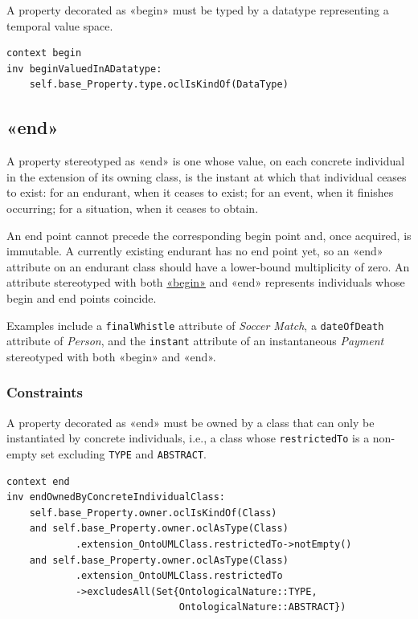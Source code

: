 \begin{constraint}
\label{beginValuedInADatatype}
A property decorated as «begin» must be typed by a datatype representing a temporal value space.
 
\begin{lstlisting}[language=OCL]
context begin
inv beginValuedInADatatype:
    self.base_Property.type.oclIsKindOf(DataType)
\end{lstlisting}
\end{constraint}
 
\subsection{«end»}
\label{stereotype:end}
 
A property stereotyped as «end» is one whose value, on each concrete individual in the extension of its owning class, is the instant at which that individual ceases to exist: for an endurant, when it ceases to exist; for an event, when it finishes occurring; for a situation, when it ceases to obtain.
 
An end point cannot precede the corresponding begin point and, once acquired, is immutable. A currently existing endurant has no end point yet, so an «end» attribute on an endurant class should have a lower-bound multiplicity of zero. An attribute stereotyped with both \hyperref[stereotype:begin]{«begin»} and «end» represents individuals whose begin and end points coincide.
 
Examples include a \texttt{finalWhistle} attribute of \textit{Soccer Match}, a \texttt{dateOfDeath} attribute of \textit{Person}, and the \texttt{instant} attribute of an instantaneous \textit{Payment} stereotyped with both «begin» and «end».
 
 
\subsubsection{Constraints}

\begin{constraint}
\label{endOwnedByConcreteIndividualClass}
A property decorated as «end» must be owned by a class that can only be instantiated by concrete individuals, i.e., a class whose \texttt{restrictedTo} is a non-empty set excluding \texttt{TYPE} and \texttt{ABSTRACT}.
 
\begin{lstlisting}[language=OCL]
context end
inv endOwnedByConcreteIndividualClass:
    self.base_Property.owner.oclIsKindOf(Class)
    and self.base_Property.owner.oclAsType(Class)
            .extension_OntoUMLClass.restrictedTo->notEmpty()
    and self.base_Property.owner.oclAsType(Class)
            .extension_OntoUMLClass.restrictedTo
            ->excludesAll(Set{OntologicalNature::TYPE,
                              OntologicalNature::ABSTRACT})
\end{lstlisting}
\end{constraint}

